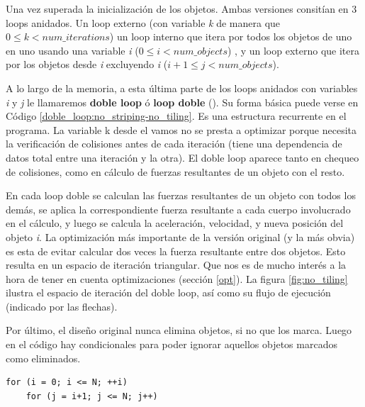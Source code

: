 \documentclass{article}
\begin{document}
Una vez superada la inicialización de los objetos. Ambas versiones consitían en 3 loops anidados.
Un loop externo (con variable \textit{k} de manera que $0\leq{k} < {num\_iterations}$)
un loop interno que itera por todos los objetos de uno en uno usando una variable \textit{i}
($0\leq{i} < {num\_objects}$) , y un loop externo que itera por los objetos desde \textit{i}
excluyendo \textit{i} ($i+1\leq{j} < {num\_objects}$).

A lo largo de la memoria, a esta última
parte de los loops anidados con variables \textit{i} y \textit{j} le llamaremos \textbf{doble loop} ó \textbf{loop doble} ().
Su forma básica puede verse en Código \ref{doble_loop:no_striping-no_tiling}.
Es una estructura recurrente en el programa. La variable k desde el vamos no se presta a optimizar porque
necesita la verificación de colisiones antes de cada iteración (tiene una dependencia de datos total
entre una iteración y la otra). El doble loop aparece tanto en chequeo de colisiones, como en cálculo de
fuerzas resultantes de un objeto con el resto.


En cada loop doble se calculan las fuerzas resultantes de un objeto con todos los demás, se aplica la
correspondiente fuerza resultante a cada cuerpo involucrado en el cálculo, y luego se calcula la
aceleración, velocidad, y nueva posición del objeto \textit{i}. La optimización más importante de la
versión original (y la más obvia) es esta de evitar calcular dos veces la fuerza resultante entre
dos objetos. Esto resulta en un espacio de iteración triangular. Que nos es de mucho interés
a la hora de tener en cuenta optimizaciones (sección \ref{opt}). La figura \ref{fig:no_tiling} ilustra
el espacio de iteración del doble loop, así como su flujo de ejecución (indicado por las flechas).


Por último, el diseño original nunca elimina objetos, si no que
los marca. Luego en el código hay condicionales para poder
ignorar aquellos objetos marcados como eliminados.

\begin{lstlisting}[style=CStyle,label=doble_loop:no_striping-no_tiling,caption=doble loop simple.]
for (i = 0; i <= N; ++i)
	for (j = i+1; j <= N; j++)
\end{lstlisting}
\end{document}

